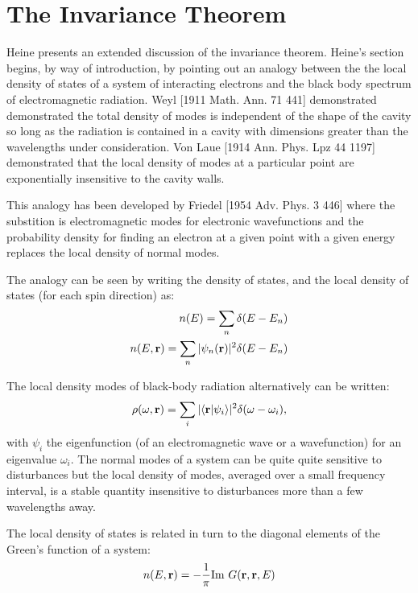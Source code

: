 \section{The Invariance Theorem}
\label{sec:invariance}
Heine presents an extended discussion of the invariance
theorem. Heine's section begins, by way of introduction, by pointing 
out an analogy between the the local density of states of a system of interacting
electrons and the black body spectrum of electromagnetic radiation.
Weyl [1911 Math. Ann. 71 441] demonstrated demonstrated the total density
of modes is independent of the shape of the cavity so long as the
radiation is contained in a cavity with dimensions greater than the wavelengths
under consideration. Von Laue [1914 Ann. Phys. Lpz 44 1197] demonstrated that the local density of modes at 
a particular point are exponentially insensitive to the cavity walls.

This analogy has been developed by Friedel [1954 Adv. Phys. 3 446] where
the substition is electromagnetic modes for electronic wavefunctions and
the probability density for finding an electron at a given point
with a given energy replaces the local density of normal modes.\cite{annett94}

The analogy can be seen by writing the density of states,
and the local density of states (for each spin direction) as:
%
\begin{eqnarray}
n(E) = \sum_{n}\delta(E-E_{n}) \\
n(E,{\bf r}) = \sum_{n} |\psi_{n}({\bf r})|^{2}\delta(E-E_{n})
\end{eqnarray}
%

The local density modes of black-body radiation alternatively can be written:
%
\begin{equation}
\rho(\omega,{\bf r})= \sum_{i} |\langle {\bf r}| \psi_{i}\rangle|^{2}\delta(\omega-\omega_{i}),
\end{equation}
%
with $\psi_{i}$ the eigenfunction (of an electromagnetic wave or a wavefunction) for an eigenvalue $\omega_{i}$.\cite{annett94}
The normal modes of a system can be quite quite sensitive to disturbances but the 
local density of modes, averaged over a small frequency interval, is a stable quantity 
insensitive to disturbances more than a few wavelengths away.

The local density of states is related in turn to the diagonal elements of
the Green's function of a system:
%
\begin{equation}
n(E,{\bf r}) = -\frac{1}{\pi}{\rm Im}~G({\bf r},{\bf r},E)
\end{equation}
%

